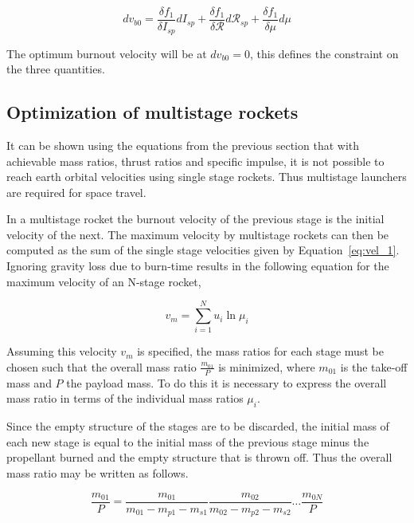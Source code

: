 \begin{equation}
    dv_{b0}=\frac{\delta f_1}{\delta I_{sp}} dI_{sp}
           +\frac{\delta f_1}{\delta \mathscr{R}} d\mathscr{R}_{sp}
           +\frac{\delta f_1}{\delta \mu} d\mu
\end{equation}

The optimum burnout velocity will be at $dv_{b0}=0$, this defines the constraint on the three quantities.


\subsection{Optimization of multistage rockets}
It can be shown using the equations from the previous section that with achievable mass ratios, thrust ratios and specific impulse, it is not possible to reach earth orbital velocities using single stage rockets. Thus multistage launchers are required for space travel.

In a multistage rocket the burnout velocity of the previous stage is the initial velocity of the next. The maximum velocity by multistage rockets can then be computed as the sum of the single stage velocities given by Equation~\eqref{eq:vel_1}.
Ignoring gravity loss due to burn-time results in the following equation for the maximum velocity of an N-stage rocket,

\begin{equation}
    \label{eq:vel_vm}
    v_m = \sum_{i=1}^N u_i \ln{\mu_i}
\end{equation}


Assuming this velocity $v_m$ is specified, the mass ratios for each stage must be chosen such that the overall mass ratio $\frac{m_{01}}{P}$ is minimized, where $m_{01}$ is the take-off mass and $P$ the payload mass. To do this it is necessary to express the overall mass ratio in terms of the individual mass ratios $\mu_i$.

Since the empty structure of the stages are to be discarded, the initial mass of each new stage is equal to the initial mass of the previous stage minus the propellant burned and the empty structure that is thrown off. Thus the overall mass ratio may be written as follows.

\begin{equation}
    \label{eq:overall_mu_1}
    \frac{m_{01}}{P} = \frac{m_{01}}{m_{01} - m_{p1} - m_{s1}} 
                       \frac{m_{02}}{m_{02} - m_{p2} - m_{s2}} \dots
                       \frac{m_{0N}}{P}
\end{equation}


